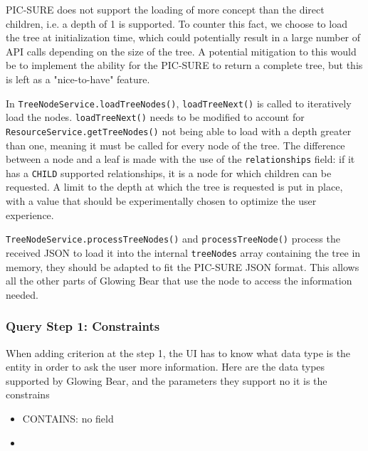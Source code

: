 PIC-SURE does not support the loading of more concept than the direct children, i.e. a depth of 1 is supported.
To counter this fact, we choose to load the tree at initialization time, which could potentially result in a large number of API calls depending on the size of the tree.
A potential mitigation to this would be to implement the ability for the PIC-SURE to return a complete tree, but this is left as a "nice-to-have" feature.

In \verb|TreeNodeService.loadTreeNodes()|, \verb|loadTreeNext()| is called to iteratively load the nodes.
\verb|loadTreeNext()| needs to be modified to account for \verb|ResourceService.getTreeNodes()| not being able to load with a depth greater than one, 
meaning it must be called for every node of the tree.
The difference between a node and a leaf is made with the use of the \verb|relationships| field: if it has a \verb|CHILD| supported relationships, it is a node for which children can be requested.
A limit to the depth at which the tree is requested is put in place, with a value that should be experimentally chosen to optimize the user experience.

\verb|TreeNodeService.processTreeNodes()| and \verb|processTreeNode()| process the received JSON to load it into the internal \verb|treeNodes| array containing the tree in memory, they should be adapted to fit the PIC-SURE JSON format.
This allows all the other parts of Glowing Bear that use the node to access the information needed.


\subsubsection{Query Step 1: Constraints}

When adding criterion at the step 1, the UI has to know what data type is the entity in order to ask the user more information.
Here are the data types supported by Glowing Bear, and the parameters they support no it is the constrains
\begin{itemize}
    \item CONTAINS: no field
    \item 
\end{itemize}

